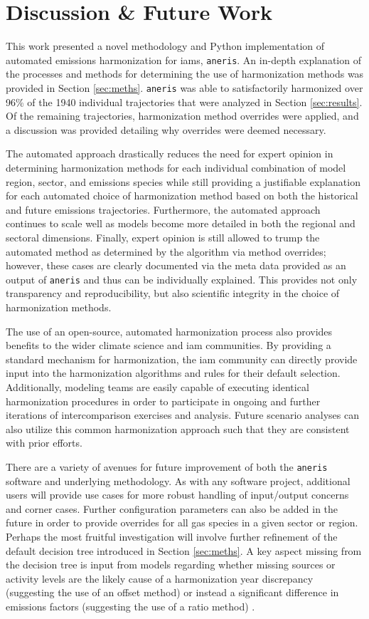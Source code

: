 \documentclass[review]{elsarticle}
\newcommand{\code}[1]{\lstinline[basicstyle=\ttfamily\color{black}]|#1|}
\begin{document}
\section{Discussion \& Future Work}\label{sec:future}

This work presented a novel methodology and Python implementation of automated
emissions harmonization for \glspl{iam}, \code{aneris}. An in-depth explanation
of the processes and methods for determining the use of harmonization methods
was provided in Section \ref{sec:meths}. \code{aneris} was able to
satisfactorily harmonized over 96\% of the 1940 individual trajectories that
were analyzed in Section \ref{sec:results}. Of the remaining trajectories,
harmonization method overrides were applied, and a discussion was provided
detailing why overrides were deemed necessary.

The automated approach drastically reduces the need for expert opinion in
determining harmonization methods for each individual combination of model
region, sector, and emissions species while still providing a justifiable
explanation for each automated choice of harmonization method based on both the
historical and future emissions trajectories. Furthermore, the automated
approach continues to scale well as models become more detailed in both the
regional and sectoral dimensions. Finally, expert opinion is still allowed to
trump the automated method as determined by the algorithm via method overrides;
however, these cases are clearly documented via the meta data provided as an
output of \code{aneris} and thus can be individually explained. This provides
not only transparency and reproducibility, but also scientific integrity in the
choice of harmonization methods.

The use of an open-source, automated harmonization process also provides
benefits to the wider climate science and \gls{iam} communities. By providing a
standard mechanism for harmonization, the \gls{iam} community can directly provide
input into the harmonization algorithms and rules for their default
selection. Additionally, modeling teams are easily capable of executing
identical harmonization procedures in order to participate in ongoing and
further iterations of intercomparison exercises and analysis. Future scenario
analyses can also utilize this common harmonization approach such that they are
consistent with prior efforts.

There are a variety of avenues for future improvement of both the \code{aneris}
software and underlying methodology. As with any software project, additional
users will provide use cases for more robust handling of input/output concerns
and corner cases. Further configuration parameters can also be added in the
future in order to provide overrides for all gas species in a given sector or
region. Perhaps the most fruitful investigation will involve further refinement
of the default decision tree introduced in Section \ref{sec:meths}. A key aspect
missing from the decision tree is input from models regarding whether missing
sources or activity levels are the likely cause of a harmonization year
discrepancy (suggesting the use of an offset method) or instead a significant
difference in emissions factors (suggesting the use of a ratio method)
\cite{rogelj_discrepancies_2011}.
\end{document}
